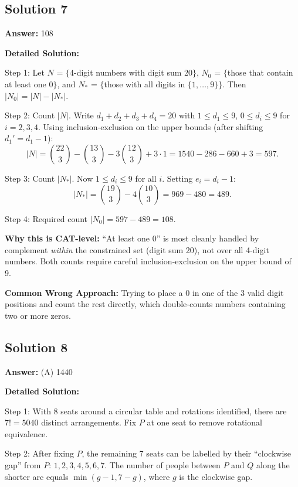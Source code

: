 \documentclass[11pt,a4paper]{article}
\begin{document}
\subsection*{Solution 7}
\textbf{Answer:} 108

\textbf{Detailed Solution:}

Step 1: Let \(N\) = \(\{\)4-digit numbers with digit sum 20\(\}\), \(N_0\) = \(\{\)those that contain at least one 0\(\}\), and \(N_*\) = \(\{\)those with all digits in \(\{1, \ldots, 9\}\}\). Then \(|N_0| = |N| - |N_*|\).

Step 2: Count \(|N|\). Write \(d_1 + d_2 + d_3 + d_4 = 20\) with \(1 \leq d_1 \leq 9\), \(0 \leq d_i \leq 9\) for \(i = 2, 3, 4\). Using inclusion-exclusion on the upper bounds (after shifting \(d_1' = d_1 - 1\)):
\[
|N| = \binom{22}{3} - \binom{13}{3} - 3\binom{12}{3} + 3 \cdot 1 = 1540 - 286 - 660 + 3 = 597.
\]

Step 3: Count \(|N_*|\). Now \(1 \leq d_i \leq 9\) for all \(i\). Setting \(e_i = d_i - 1\):
\[
|N_*| = \binom{19}{3} - 4 \binom{10}{3} = 969 - 480 = 489.
\]

Step 4: Required count \(|N_0| = 597 - 489 = 108\).

\textbf{Why this is CAT-level:} ``At least one 0'' is most cleanly handled by complement \emph{within} the constrained set (digit sum 20), not over all 4-digit numbers. Both counts require careful inclusion-exclusion on the upper bound of 9.

\textbf{Common Wrong Approach:} Trying to place a 0 in one of the 3 valid digit positions and count the rest directly, which double-counts numbers containing two or more zeros.

\subsection*{Solution 8}
\textbf{Answer:} (A) 1440

\textbf{Detailed Solution:}

Step 1: With 8 seats around a circular table and rotations identified, there are \(7! = 5040\) distinct arrangements. Fix \(P\) at one seat to remove rotational equivalence.

Step 2: After fixing \(P\), the remaining 7 seats can be labelled by their ``clockwise gap'' from \(P\): \(1, 2, 3, 4, 5, 6, 7\). The number of people between \(P\) and \(Q\) along the shorter arc equals \(\min(g - 1, 7 - g)\), where \(g\) is the clockwise gap.
\end{document}
